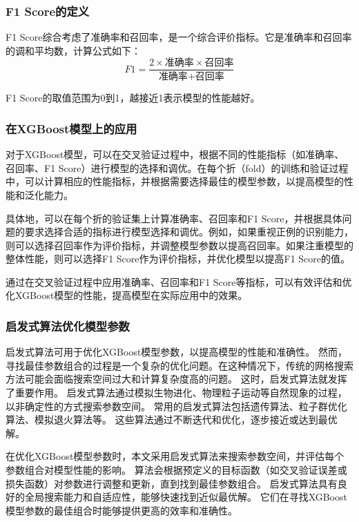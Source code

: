 \documentclass{article}
\begin{document}
\subsubsection*{F1 Score的定义}
F1 Score综合考虑了准确率和召回率，是一个综合评价指标。它是准确率和召回率的调和平均数，计算公式如下：
\[
F1 = \frac{{2 \times \text{准确率} \times \text{召回率}}}{{\text{准确率} + \text{召回率}}}
\]

F1 Score的取值范围为0到1，越接近1表示模型的性能越好。

\subsubsection*{在XGBoost模型上的应用}
对于XGBoost模型，可以在交叉验证过程中，根据不同的性能指标（如准确率、召回率、F1 Score）进行模型的选择和调优。在每个折（fold）的训练和验证过程中，可以计算相应的性能指标，并根据需要选择最佳的模型参数，以提高模型的性能和泛化能力。

具体地，可以在每个折的验证集上计算准确率、召回率和F1 Score，并根据具体问题的要求选择合适的指标进行模型选择和调优。例如，如果重视正例的识别能力，则可以选择召回率作为评价指标，并调整模型参数以提高召回率。如果注重模型的整体性能，则可以选择F1 Score作为评价指标，并优化模型以提高F1 Score的值。\cite{reference9}

通过在交叉验证过程中应用准确率、召回率和F1 Score等指标，可以有效评估和优化XGBoost模型的性能，提高模型在实际应用中的效果。

\subsubsection{启发式算法优化模型参数}

启发式算法可用于优化XGBoost模型参数，以提高模型的性能和准确性。
然而，寻找最佳参数组合的过程是一个复杂的优化问题。在这种情况下，传统的网格搜索方法可能会面临搜索空间过大和计算复杂度高的问题。
这时，启发式算法就发挥了重要作用。
启发式算法通过模拟生物进化、物理粒子运动等自然现象的过程，以非确定性的方式搜索参数空间。
常用的启发式算法包括遗传算法、粒子群优化算法、模拟退火算法等。
这些算法通过不断迭代和优化，逐步接近或达到最优解。\cite{reference4}

在优化XGBoost模型参数时，本文采用启发式算法来搜索参数空间，并评估每个参数组合对模型性能的影响。
算法会根据预定义的目标函数（如交叉验证误差或损失函数）对参数进行调整和更新，直到找到最佳参数组合。
启发式算法具有良好的全局搜索能力和自适应性，能够快速找到近似最优解。
它们在寻找XGBoost模型参数的最佳组合时能够提供更高的效率和准确性。
\end{document}
